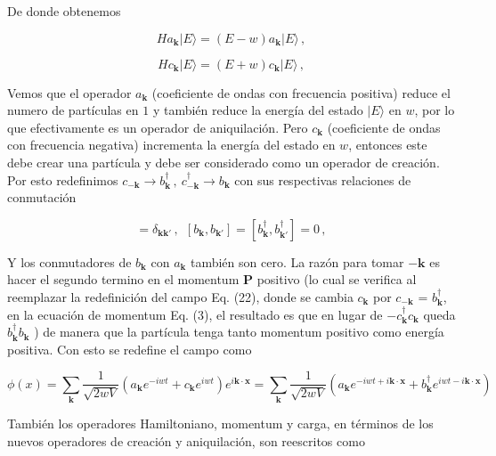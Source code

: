 \documentclass{article}
\begin{document}
De donde obtenemos

\begin{equation}
 Ha_{\mathbf{k}} |E\rangle =(E-w)a_{\mathbf{k}} |E\rangle\,,
\end{equation}

\begin{equation}
 Hc_{\mathbf{k}} |E\rangle =(E+w)c_{\mathbf{k}} |E\rangle\,,
\end{equation}

Vemos que el operador $a_{\mathbf{k}}$ (coeficiente de ondas con frecuencia positiva) reduce el numero de partículas en $1$ y también reduce la energía del estado $|E\rangle$ en $w$, por lo que efectivamente es un operador de aniquilación. Pero  $c_{\mathbf{k}}$ (coeficiente de ondas con frecuencia negativa) incrementa la energía del estado en $w$, entonces este debe crear una partícula y debe ser considerado como un operador de creación. Por esto redefinimos
$c_{\mathbf{-k}} \rightarrow b_{\mathbf{k}}^\dagger\,, \  c_{\mathbf{-k}}^\dagger \rightarrow b_{\mathbf{k}}$ con sus respectivas relaciones de conmutación 

\begin{equation}
  [b_{\mathbf{k}},b_{{\mathbf{k}}'}^\dagger] = \delta_{\mathbf{kk'}}\,, \ \  [b_{\mathbf{k}},b_{{\mathbf{k}}'}] = [b_{\mathbf{k}}^\dagger,b_{{\mathbf{k}}'}^\dagger] = 0\,,
\end{equation}

Y los conmutadores de $b_{\mathbf{k}}$ con $a_{\mathbf{k}}$ también son cero. La razón para tomar $\mathbf{-k}$ es hacer el segundo termino en el momentum $\mathbf{P}$ positivo (lo cual se verifica al reemplazar la redefinición del campo Eq. (22), donde se cambia $c_\mathbf{k}$ por $c_\mathbf{-k}$ = $b_\mathbf{k}^\dagger$, en la ecuación de momentum Eq. (3), el resultado es que en lugar de $-c_\mathbf{k}^\dagger c_\mathbf{k}$ queda $b_\mathbf{k}^\dagger b_\mathbf{k}$ ) de manera que la partícula tenga tanto momentum positivo como energía positiva. Con esto se redefine el campo como

\begin{equation}
  \phi(x) = \sum_{\mathbf{k}} \frac{1}{\sqrt{2wV}} (a_{\mathbf{k}}e^{-iwt}+c_{\mathbf{k}}e^{iwt}) e^{i\mathbf{k} \cdot \mathbf{x}} = \sum_{\mathbf{k}} \frac{1}{\sqrt{2wV}} (a_{\mathbf{k}}e^{-iwt+i\mathbf{k} \cdot \mathbf{x}}+b_{\mathbf{k}}^\dagger e^{iwt-i\mathbf{k} \cdot \mathbf{x}})
\end{equation}

También los operadores Hamiltoniano, momentum y carga, en términos de los nuevos operadores de creación y aniquilación, son reescritos como
\end{document}
